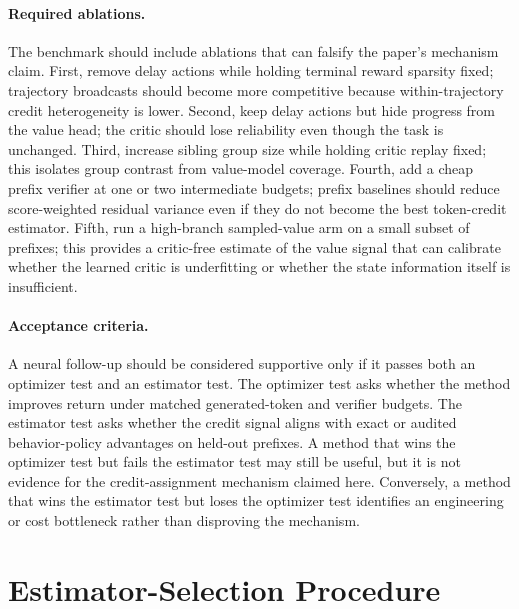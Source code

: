 \documentclass[11pt]{article}
\begin{document}
\paragraph{Required ablations.}
The benchmark should include ablations that can falsify the paper's mechanism
claim. First, remove delay actions while holding terminal reward sparsity fixed;
trajectory broadcasts should become more competitive because within-trajectory
credit heterogeneity is lower. Second, keep delay actions but hide progress
from the value head; the critic should lose reliability even though the task is
unchanged. Third, increase sibling group size while holding critic replay fixed;
this isolates group contrast from value-model coverage. Fourth, add a cheap
prefix verifier at one or two intermediate budgets; prefix baselines should
reduce score-weighted residual variance even if they do not become the best
token-credit estimator. Fifth, run a high-branch sampled-value arm on a small
subset of prefixes; this provides a critic-free estimate of the value signal
that can calibrate whether the learned critic is underfitting or whether the
state information itself is insufficient.

\paragraph{Acceptance criteria.}
A neural follow-up should be considered supportive only if it passes both an
optimizer test and an estimator test. The optimizer test asks whether the method
improves return under matched generated-token and verifier budgets. The
estimator test asks whether the credit signal aligns with exact or audited
behavior-policy advantages on held-out prefixes. A method that wins the
optimizer test but fails the estimator test may still be useful, but it is not
evidence for the credit-assignment mechanism claimed here. Conversely, a method
that wins the estimator test but loses the optimizer test identifies an
engineering or cost bottleneck rather than disproving the mechanism.

\section{Estimator-Selection Procedure}
\end{document}
